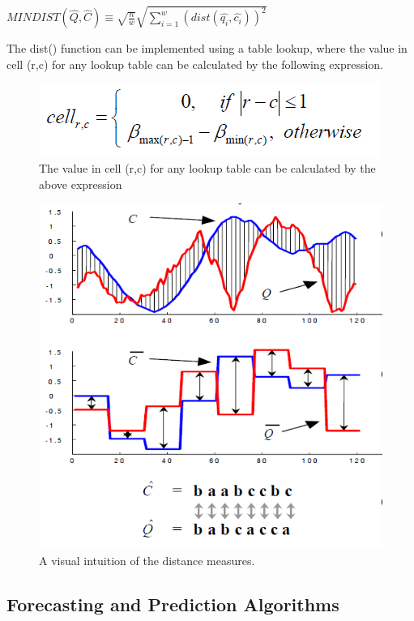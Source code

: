 \documentclass[12pt,a4paper]{report}
\begin{document}
\begin{enumerate}
{$MINDIST(\hat{Q}, \hat{C}) \equiv \sqrt{\frac{n}{w}} \sqrt{\sum_{i=1}^{w} (dist(\hat{q_i}, \hat{c_i}))^{2}} $

The dist() function can be implemented using a table lookup, where the value in cell (r,c) for any lookup table can be calculated by the following expression.

\begin{figure}[h!]
	\centering
		\includegraphics[scale=0.8]{screenshots/sax/dist.png}
		\caption{The value in cell (r,c) for any lookup table can be calculated by the above expression}
\end{figure}


\begin{figure}[h!]
	\centering
		\includegraphics[scale=0.8]{screenshots/sax/distance.png}
		\caption{A visual intuition of the distance measures.}
\end{figure}
}

\end{enumerate}
\subsection{Forecasting and Prediction Algorithms}
\end{document}
